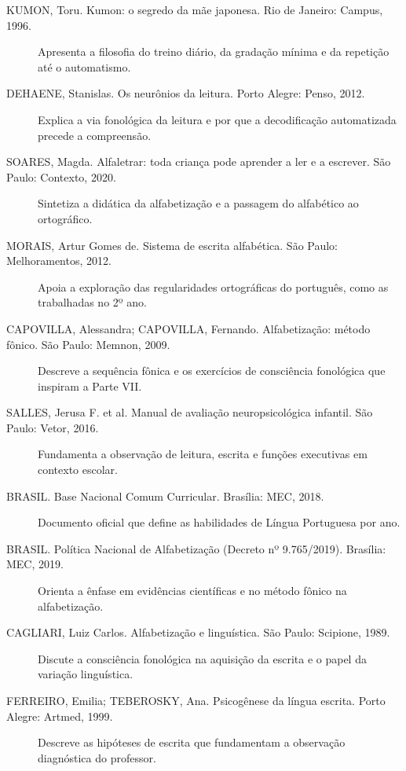 \begin{description}

  \item[KUMON, Toru. Kumon: o segredo da mãe japonesa. Rio de Janeiro: Campus, 1996.] Apresenta a filosofia do treino diário, da gradação mínima e da repetição até o automatismo.

  \item[DEHAENE, Stanislas. Os neurônios da leitura. Porto Alegre: Penso, 2012.] Explica a via fonológica da leitura e por que a decodificação automatizada precede a compreensão.

  \item[SOARES, Magda. Alfaletrar: toda criança pode aprender a ler e a escrever. São Paulo: Contexto, 2020.] Sintetiza a didática da alfabetização e a passagem do alfabético ao ortográfico.

  \item[MORAIS, Artur Gomes de. Sistema de escrita alfabética. São Paulo: Melhoramentos, 2012.] Apoia a exploração das regularidades ortográficas do português, como as trabalhadas no 2º ano.

  \item[CAPOVILLA, Alessandra; CAPOVILLA, Fernando. Alfabetização: método fônico. São Paulo: Memnon, 2009.] Descreve a sequência fônica e os exercícios de consciência fonológica que inspiram a Parte VII.

  \item[SALLES, Jerusa F. et al. Manual de avaliação neuropsicológica infantil. São Paulo: Vetor, 2016.] Fundamenta a observação de leitura, escrita e funções executivas em contexto escolar.

  \item[BRASIL. Base Nacional Comum Curricular. Brasília: MEC, 2018.] Documento oficial que define as habilidades de Língua Portuguesa por ano.

  \item[BRASIL. Política Nacional de Alfabetização (Decreto nº 9.765/2019). Brasília: MEC, 2019.] Orienta a ênfase em evidências científicas e no método fônico na alfabetização.

  \item[CAGLIARI, Luiz Carlos. Alfabetização e linguística. São Paulo: Scipione, 1989.] Discute a consciência fonológica na aquisição da escrita e o papel da variação linguística.

  \item[FERREIRO, Emilia; TEBEROSKY, Ana. Psicogênese da língua escrita. Porto Alegre: Artmed, 1999.] Descreve as hipóteses de escrita que fundamentam a observação diagnóstica do professor.

\end{description}

